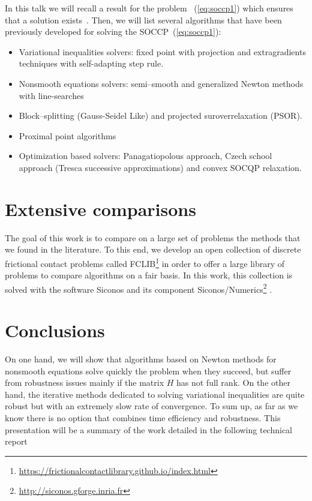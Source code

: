 \documentclass[11pt,a4paper]{article}
\begin{document}
In this talk we will recall a result for the problem ~(\ref{eq:soccp1}) which ensures that a solution exists~\cite{Acary.ea_ZAMM2011}. Then, we will list several algorithms that have been previously developed for solving the SOCCP~(\ref{eq:soccp1}):
\begin{itemize}
  \setlength\itemsep{0em}
\item Variational inequalities solvers: fixed point with projection and extragradients techniques with self-adapting step rule.
\item Nonsmooth equations solvers: semi--smooth and generalized Newton methods with line-searches
\item Block--splitting (Gauss-Seidel Like) and projected suroverrelaxation (PSOR).
\item Proximal point algorithms
\item Optimization based solvers: Panagatiopolous approach, Czech school approach (Tresca successive approximations) and convex SOCQP relaxation.
\end{itemize}
\vspace{-0.6cm}\section{Extensive comparisons}
The goal of this work is to compare on a large set of problems the methods that we found in the literature. To this end, we develop an open collection of discrete frictional contact problems called FCLIB\footnote{\href{https://frictionalcontactlibrary.github.io/index.html}{https://frictionalcontactlibrary.github.io/index.html}} in order to offer a large library of problems to compare algorithms on a fair basis.  In this work, this collection is solved with the software {\sc Siconos} and its component {\sc Siconos/Numerics}\footnote{\href{http://siconos.gforge.inria.fr}{http://siconos.gforge.inria.fr}} .


\vspace{-0.5cm}\section{Conclusions}

On one hand, we will show that algorithms based on Newton methods for nonsmooth equations solve quickly the problem when they succeed, but suffer from robustness issues mainly if the matrix $H$ has not full rank. On the other hand, the 
iterative methods dedicated to solving variational inequalities are quite robust but with an extremely slow rate of convergence. To sum up, as far as we know there is no option that combines time efficiency and robustness. This presentation will be a summary of the work detailed in the following technical report~\cite{acary:hal-01630836}
\end{document}
